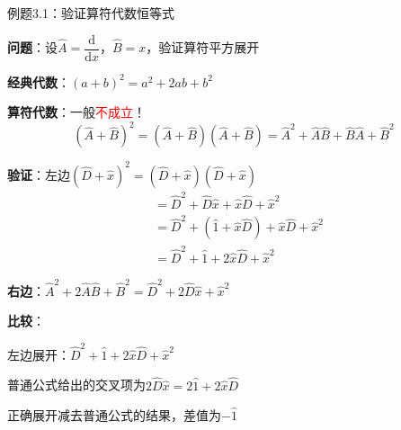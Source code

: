 \begin{frame}{例题3.1：验证算符代数恒等式}

  \textbf{问题}：设$\hat{A} = \dfrac{\mathrm{d}}{\mathrm{d}x}$，$\hat{B} = x$，验证算符平方展开

  \iqbsep

  \begin{iqbitemize}
    \item \textbf{经典代数}：$(a+b)^2 = a^2 + 2ab + b^2$

    \item \textbf{算符代数}：一般\textcolor{red}{不成立}！
    \[
      (\hat{A} + \hat{B})^2 = (\hat{A} + \hat{B})(\hat{A} + \hat{B}) = \hat{A}^2 + \hat{A}\hat{B} + \hat{B}\hat{A} + \hat{B}^2
    \]

    \item \textbf{验证}：左边$(\hat{D} + \hat{x})^2 = (\hat{D} + \hat{x})(\hat{D} + \hat{x})$
    \begin{align*}
      &= \hat{D}^2 + \hat{D}\hat{x} + \hat{x}\hat{D} + \hat{x}^2 \\
      &= \hat{D}^2 + (\hat{1} + \hat{x}\hat{D}) + \hat{x}\hat{D} + \hat{x}^2 \\
      &= \hat{D}^2 + \hat{1} + 2\hat{x}\hat{D} + \hat{x}^2
    \end{align*}

    \item \textbf{右边}：$\hat{A}^2 + 2\hat{A}\hat{B} + \hat{B}^2 = \hat{D}^2 + 2\hat{D}\hat{x} + \hat{x}^2$

    \item \textbf{比较}：
    \begin{iqbitemize}
      \item 左边展开：$\hat{D}^2 + \hat{1} + 2\hat{x}\hat{D} + \hat{x}^2$
      \item 普通公式给出的交叉项为$2\hat{D}\hat{x}=2\hat{1}+2\hat{x}\hat{D}$
      \item 正确展开减去普通公式的结果，差值为$-\hat{1}$
    \end{iqbitemize}
  \end{iqbitemize}

\end{frame}

